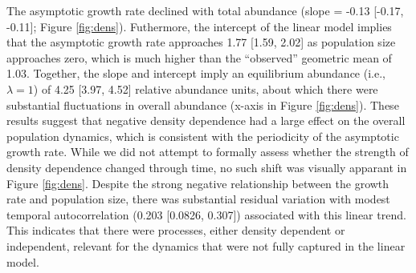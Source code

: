 The asymptotic growth rate declined with total abundance
(slope = -0.13 [-0.17, -0.11]; Figure \ref{fig:dens}).
Futhermore, 
the intercept of the linear model implies that 
the asymptotic growth rate approaches 1.77 [1.59, 2.02] 
as population size approaches zero,
which is much higher than the ``observed'' geometric mean of 1.03.
Together, the slope and intercept imply an equilibrium abundance (i.e., $\lambda=1$)
of 4.25 [3.97, 4.52] relative abundance units,
about which there were substantial fluctuations in overall abundance 
(x-axis in Figure \ref{fig:dens}).
These results suggest that negative density dependence
had a large effect on the overall population dynamics,
which is consistent with the periodicity of the asymptotic growth rate.
While we did not attempt to formally assess whether the strength of density dependence
changed through time,
no such shift was visually apparant in Figure \ref{fig:dens}.
Despite the strong negative relationship between the growth rate and population size, 
there was substantial residual variation with modest
temporal autocorrelation (0.203 [0.0826, 0.307]) associated with this linear trend.
This indicates that there were processes, either density dependent or independent,
relevant for the dynamics that were not fully captured in the linear model.

